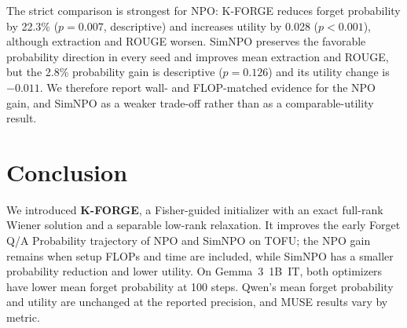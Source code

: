 \documentclass[11pt]{article}
\begin{document}
\long{}

The strict comparison is strongest for NPO: K-FORGE reduces forget probability by 22.3\% ($p=0.007$, descriptive) and increases utility by 0.028 ($p<0.001$), although extraction and ROUGE worsen. SimNPO preserves the favorable probability direction in every seed and improves mean extraction and ROUGE, but the 2.8\% probability gain is descriptive ($p=0.126$) and its utility change is $-0.011$. We therefore report wall- and FLOP-matched evidence for the NPO gain, and SimNPO as a weaker trade-off rather than as a comparable-utility result.


\section{Conclusion}
\label{sec:conclusion}

We introduced \textbf{K-FORGE}, a Fisher-guided initializer with an exact full-rank Wiener solution and a separable low-rank relaxation. It improves the early Forget Q/A Probability trajectory of NPO and SimNPO on TOFU; the NPO gain remains when setup FLOPs and time are included, while SimNPO has a smaller probability reduction and lower utility. On Gemma~3~1B~IT, both optimizers have lower mean forget probability at 100 steps. Qwen's mean forget probability and utility are unchanged at the reported precision, and MUSE results vary by metric.
\end{document}
